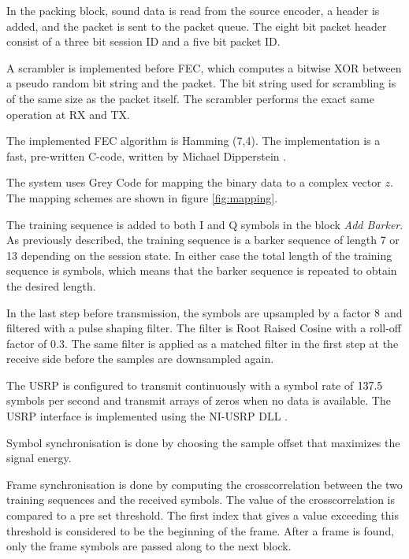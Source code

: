 In the packing block, sound data is read from the source encoder, a header is added, and the packet is sent to the packet queue. The eight bit packet header consist of a three bit session ID and a five bit packet ID. 

A scrambler is implemented before FEC, which computes a bitwise XOR between a pseudo random bit string and the packet. The bit string used for scrambling is of the same size as the packet itself. The scrambler performs the exact same operation at RX and TX.

The implemented FEC algorithm is Hamming (7,4). The implementation is a fast, pre-written C-code, written by Michael Dipperstein \cite{hamming}. 

The system uses Grey Code for mapping the binary data to a complex vector $z$. The mapping schemes are shown in figure \ref{fig:mapping}.



The training sequence is added to both I and Q symbols in the block \textit{Add Barker}. As previously described, the training sequence is a barker sequence of length 7 or 13 depending on the session state. In either case the total length of the training sequence is \barkerSymbols symbols, which means that the barker sequence is repeated to obtain the desired length. 

In the last step before transmission, the symbols are upsampled by a factor $8$ and filtered with a pulse shaping filter. The filter is Root Raised Cosine with a roll-off factor of 0.3. The same filter is applied as a matched filter in the first step at the receive side before the samples are downsampled again. 

The USRP is configured to transmit continuously with a symbol rate of $137.5$ symbols per second and transmit arrays of zeros when no data is available. The USRP interface is implemented using the NI-USRP DLL \cite{labviewDLL}.

Symbol synchronisation is done by choosing the sample offset that maximizes the signal energy. 

Frame synchronisation is done by computing the crosscorrelation between the two training sequences and the received symbols. The value of the crosscorrelation is compared to a pre set threshold. The first index that gives a value exceeding this threshold is considered to be the beginning of the frame. After a frame is found, only the frame symbols are passed along to the next block.

